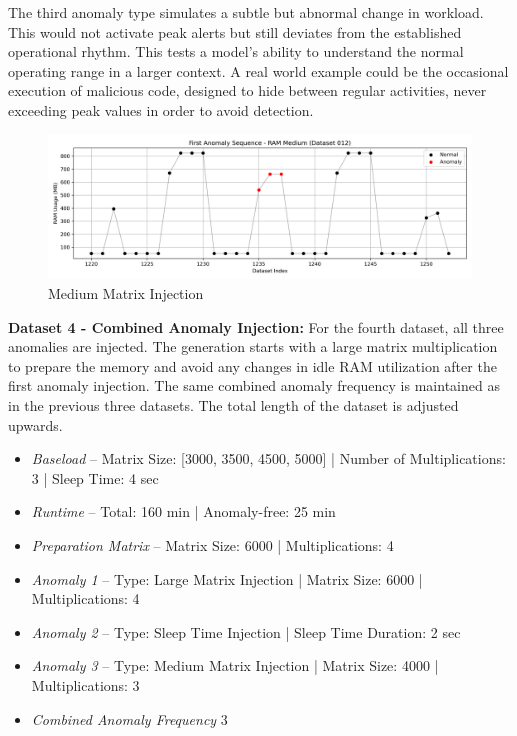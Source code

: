 \documentclass[12pt,oneside]{article}
\begin{document}
The third anomaly type simulates a subtle but abnormal change in workload. This would not activate peak alerts but still deviates from the established operational rhythm. This tests a model's ability to understand the normal operating range in a larger context. A real world example could be the occasional execution of malicious code, designed to hide between regular activities, never exceeding peak values in order to avoid detection.

\begin{figure}[H] %
    \centering %
    \includegraphics[width=\textwidth]{anomaly_sequence_12}
    \caption{Medium Matrix Injection}
    \label{fig:anomaly_12} %
\end{figure}

\textbf{Dataset 4 - Combined Anomaly Injection:} For the fourth dataset, all three anomalies are injected. The generation starts with a large matrix multiplication to prepare the memory and avoid any changes in idle RAM utilization after the first anomaly injection. The same combined anomaly frequency is maintained as in the previous three datasets. The total length of the dataset is adjusted upwards. 
\begin{itemize}
    \item \textit{Baseload} -- Matrix Size: [3000, 3500, 4500, 5000] | Number of Multiplications: 3 | Sleep Time: 4 sec
    \item \textit{Runtime} -- Total: 160 min | Anomaly-free: 25 min 
    \item \textit{Preparation Matrix} -- Matrix Size: 6000 | Multiplications: 4
    \item \textit{Anomaly 1} -- Type: Large Matrix Injection | Matrix Size: 6000 | Multiplications: 4
    \item \textit{Anomaly 2} -- Type: Sleep Time Injection | Sleep Time Duration: 2 sec
    \item \textit{Anomaly 3} -- Type: Medium Matrix Injection | Matrix Size: 4000 | Multiplications: 3 
    \item \textit{Combined Anomaly Frequency} 3
\end{itemize}
\end{document}
